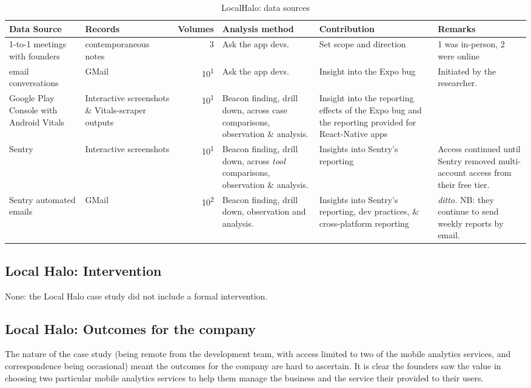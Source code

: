 \begin{table}
    \centering
    \footnotesize
    \tabcolsep=0.12cm
    \begin{tabular}{p{2.4cm}p{2.4cm}rp{2.4cm}p{3cm}p{2.5cm}}
        Data Source & Records & Volumes & Analysis method & Contribution & Remarks \\
        \toprule
         1-to-1 meetings with founders & contemporaneous notes\footnotemark & 3 & Ask the app devs. & Set scope and direction & 1 was in-person, 2 were online \\
         email conversations & GMail & 10\textsuperscript{1} & Ask the app devs. & Insight into the Expo bug & Initiated by the researcher. \\
         Google Play Console with Android Vitals &Interactive screenshots \& Vitals-scraper outputs &10\textsuperscript{1} & Beacon finding, drill down, across case comparisons, observation \& analysis. & Insight into the reporting effects of the Expo bug and the reporting provided for React-Native apps &  \\
         Sentry & Interactive screenshots & 10\textsuperscript{1} & Beacon finding, drill down, across \textit{tool} comparisons\footnotemark, observation \& analysis. & Insights into Sentry's reporting & Access continued until Sentry removed multi-account access from their free tier. \\
         Sentry automated emails &GMail & 10\textsuperscript{2} & Beacon finding, drill down, observation and analysis. & Insights into Sentry's reporting, dev practices, \& cross-platform reporting & \textit{ditto.} NB: they continue to send weekly reports by email. \\
         \bottomrule
    \end{tabular}
    \caption{LocalHalo: data sources}
    \label{tab:localhalo-data-sources}
\end{table}


\subsection{Local Halo: Intervention}
None: the Local Halo case study did not include a formal intervention.

\subsection{Local Halo: Outcomes for the company}
The nature of the case study (being remote from the development team, with access limited to two of the mobile analytics services, and correspondence being occasional) meant the outcomes for the company are hard to ascertain. It is clear the founders saw the value in choosing two particular mobile analytics services to help them manage the business and the service their provided to their users. 

